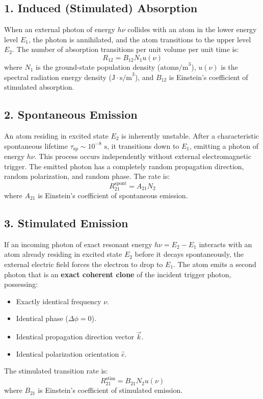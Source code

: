 \subsection{1. Induced (Stimulated) Absorption}
When an external photon of energy $h\nu$ collides with an atom in the lower energy level $E_1$, the photon is annihilated, and the atom transitions to the upper level $E_2$. The number of absorption transitions per unit volume per unit time is:
\begin{equation}
R_{12} = B_{12} N_1 u(\nu)
\end{equation}
where $N_1$ is the ground-state population density ($\text{atoms/m}^3$), $u(\nu)$ is the spectral radiation energy density ($\text{J}\cdot\text{s/m}^3$), and $B_{12}$ is Einstein's coefficient of stimulated absorption.

\subsection{2. Spontaneous Emission}
An atom residing in excited state $E_2$ is inherently unstable. After a characteristic spontaneous lifetime $\tau_{\text{sp}} \sim 10^{-8}\text{ s}$, it transitions down to $E_1$, emitting a photon of energy $h\nu$. This process occurs independently without external electromagnetic trigger. The emitted photon has a completely random propagation direction, random polarization, and random phase. The rate is:
\begin{equation}
R_{21}^{\text{spont}} = A_{21} N_2
\end{equation}
where $A_{21}$ is Einstein's coefficient of spontaneous emission.

\subsection{3. Stimulated Emission}
If an incoming photon of exact resonant energy $h\nu = E_2 - E_1$ interacts with an atom already residing in excited state $E_2$ before it decays spontaneously, the external electric field forces the electron to drop to $E_1$. The atom emits a second photon that is an \textbf{exact coherent clone} of the incident trigger photon, possessing:
\begin{itemize}[itemsep=1pt]
    \item Exactly identical frequency $\nu$.
    \item Identical phase ($\Delta\phi = 0$).
    \item Identical propagation direction vector $\vec{k}$.
    \item Identical polarization orientation $\hat{e}$.
\end{itemize}
The stimulated transition rate is:
\begin{equation}
R_{21}^{\text{stim}} = B_{21} N_2 u(\nu)
\end{equation}
where $B_{21}$ is Einstein's coefficient of stimulated emission.

